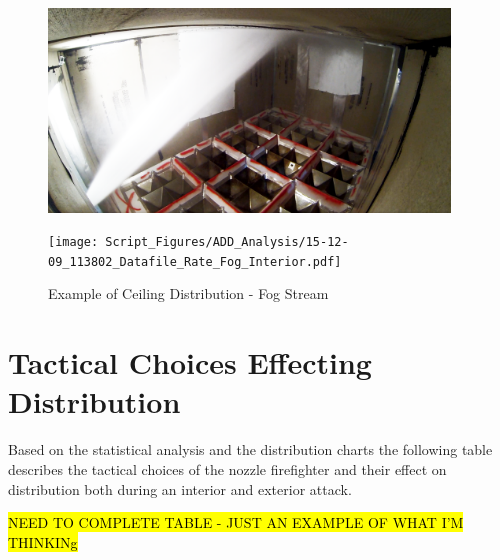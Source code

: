\documentclass[12pt,oneside]{book}
\begin{document}
\begin{figure}[H]
	\centering
	\begin{minipage}[b]{0.45\textwidth}
	\centering
	\includegraphics[width=0.95\textwidth]{Figures/Water_Distribution/Nozzle_Directions/Interior_MidCeiling_Fog.png}
	\end{minipage}
	\begin{minipage}[b]{0.45\textwidth}
	\centering
	\texttt{[image: Script\_Figures/ADD\_Analysis/15-12-09\_113802\_Datafile\_Rate\_Fog\_Interior.pdf]}
	\end{minipage}
	\caption{Example of Ceiling Distribution - Fog Stream}
	\label{fig:Interior_Fog_MidCeiling}
\end{figure}


\section{Tactical Choices Effecting Distribution}

Based on the statistical analysis and the distribution charts the following table describes the tactical choices of the nozzle firefighter and their effect on distribution both during an interior and exterior attack. 

\hl{NEED TO COMPLETE TABLE - JUST AN EXAMPLE OF WHAT I'M THINKINg}
\end{document}
